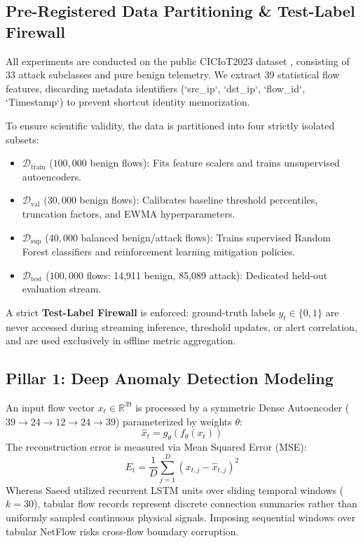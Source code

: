 \documentclass{ieeeaccess}
\begin{document}
\subsection{Pre-Registered Data Partitioning & Test-Label Firewall}
All experiments are conducted on the public CICIoT2023 dataset \cite{ciciot2023}, consisting of 33 attack subclasses and pure benign telemetry. We extract 39 statistical flow features, discarding metadata identifiers (`src\_ip`, `dst\_ip`, `flow\_id`, `Timestamp`) to prevent shortcut identity memorization.

To ensure scientific validity, the data is partitioned into four strictly isolated subsets:
\begin{itemize}
    \item $\mathcal{D}_{\text{train}}$ ($100,000$ benign flows): Fits feature scalers and trains unsupervised autoencoders.
    \item $\mathcal{D}_{\text{val}}$ ($30,000$ benign flows): Calibrates baseline threshold percentiles, truncation factors, and EWMA hyperparameters.
    \item $\mathcal{D}_{\text{sup}}$ ($40,000$ balanced benign/attack flows): Trains supervised Random Forest classifiers and reinforcement learning mitigation policies.
    \item $\mathcal{D}_{\text{test}}$ ($100,000$ flows: 14,911 benign, 85,089 attack): Dedicated held-out evaluation stream.
\end{itemize}
A strict \textbf{Test-Label Firewall} is enforced: ground-truth labels $y_t \in \{0, 1\}$ are never accessed during streaming inference, threshold updates, or alert correlation, and are used exclusively in offline metric aggregation.

\subsection{Pillar 1: Deep Anomaly Detection Modeling}
An input flow vector $x_t \in \mathbb{R}^{39}$ is processed by a symmetric Dense Autoencoder ($39 \to 24 \to 12 \to 24 \to 39$) parameterized by weights $\theta$:
\begin{equation}
    \hat{x}_t = g_{\theta}(f_{\theta}(x_t))
\end{equation}
The reconstruction error is measured via Mean Squared Error (MSE):
\begin{equation}
    E_t = \frac{1}{D} \sum_{j=1}^D (x_{t,j} - \hat{x}_{t,j})^2
\end{equation}
Whereas Saeed \cite{saeed2025} utilized recurrent LSTM units over sliding temporal windows ($k=30$), tabular flow records represent discrete connection summaries rather than uniformly sampled continuous physical signals. Imposing sequential windows over tabular NetFlow risks cross-flow boundary corruption.
\end{document}
